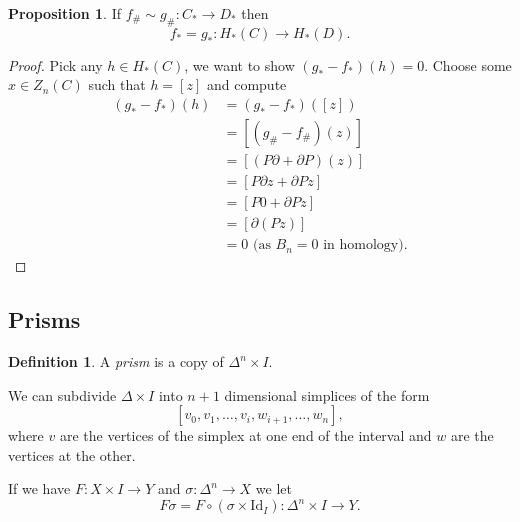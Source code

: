 \documentclass[12pt]{article}
\theoremstyle{definition}
\newtheorem*{prop}{Proposition}
\theoremstyle{definition}
\newtheorem*{defn}{Definition}
\newcommand{\C}{C_*}
\renewcommand{\H}{H_*}
\begin{document}
\begin{prop}
If $f_\#\sim g_\#\colon \C \to D_*$ then 
\[
f_* = g_* \colon \H(C) \to \H(D).
\]
\end{prop}
\begin{proof}
Pick any $h\in\H(C)$, we want to show $(g_* - f_*)(h) = 0$.
Choose some $x\in Z_n(C)$ such that $h = [z]$ and compute
\begin{align*}
(g_* - f_*)(h) &= (g_* - f_*)([z])\\
 &= [(g_\#- f_\#)(z)]\\
 &= [(P\partial + \partial P)(z)]\\
 &= [P\partial z + \partial Pz]\\
 &= [P0 + \partial Pz]\\
 &= [\partial(Pz)]\\
 &= 0\text{ (as }B_n = 0\text{ in homology)}.
\end{align*}
\end{proof}

\subsection{Prisms}
\begin{defn}
A \emph{prism} is a copy of $\Delta^n \times I$.
\end{defn}

We can subdivide $\Delta\times I$ into $n+1$ dimensional simplices of the form
\[
[v_0,v_1,\ldots,v_i,w_{i+1},\ldots,w_n],
\]
where $v$ are the vertices of the simplex at one end of the interval and $w$ are the vertices at the other.

If we have $F\colon X\times I \to Y$ and $\sigma\colon \Delta^n \to X$ we let
\[
F\sigma = F\circ(\sigma \times \mathrm{Id}_I)\colon \Delta^n \times I \to Y.
\]
\end{document}
